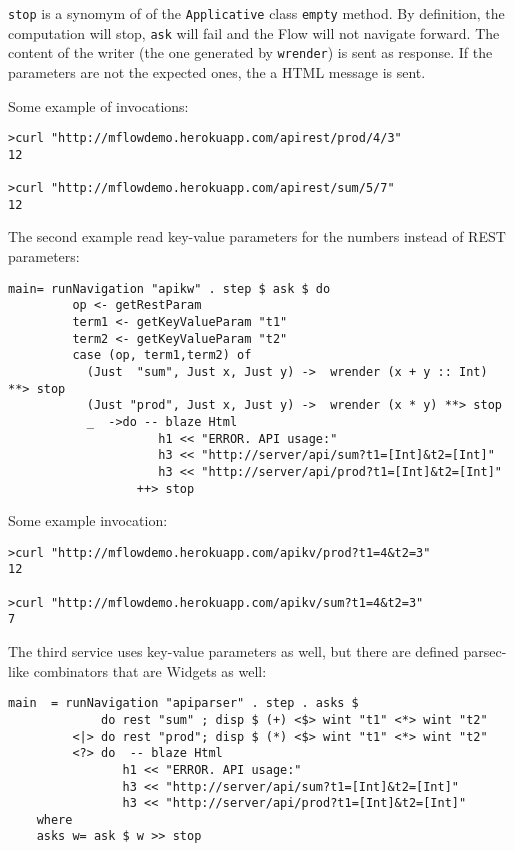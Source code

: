 \documentclass{tmr}
\begin{document}
{\tt stop} is a synomym of of the {\tt Applicative} class {\tt empty} method. By definition, the computation will stop, {\tt ask} will fail and the Flow will not
navigate forward. The content of the writer (the one generated by {\tt wrender}) is sent as response. If the parameters are not the expected ones, the a HTML message is sent.

Some example of invocations:
{\tt

\begin{verbatim}
>curl "http://mflowdemo.herokuapp.com/apirest/prod/4/3"
12

>curl "http://mflowdemo.herokuapp.com/apirest/sum/5/7"
12
\end{verbatim}
 
}
The second example read key-value parameters for the numbers instead of REST parameters:

{\tt

\begin{verbatim}
main= runNavigation "apikw" . step $ ask $ do
         op <- getRestParam
         term1 <- getKeyValueParam "t1"
         term2 <- getKeyValueParam "t2"
         case (op, term1,term2) of
           (Just  "sum", Just x, Just y) ->  wrender (x + y :: Int) **> stop
           (Just "prod", Just x, Just y) ->  wrender (x * y) **> stop
           _  ->do -- blaze Html
                     h1 << "ERROR. API usage:"
                     h3 << "http://server/api/sum?t1=[Int]&t2=[Int]"
                     h3 << "http://server/api/prod?t1=[Int]&t2=[Int]"
                  ++> stop

\end{verbatim}

}

Some example invocation:

{\tt

\begin{verbatim}
>curl "http://mflowdemo.herokuapp.com/apikv/prod?t1=4&t2=3"
12

>curl "http://mflowdemo.herokuapp.com/apikv/sum?t1=4&t2=3"
7
\end{verbatim}

}

The third service uses key-value parameters as well, but there are defined parsec-like combinators that are Widgets as well:

{\tt

\begin{verbatim}
main  = runNavigation "apiparser" . step . asks $
             do rest "sum" ; disp $ (+) <$> wint "t1" <*> wint "t2"
         <|> do rest "prod"; disp $ (*) <$> wint "t1" <*> wint "t2"
         <?> do  -- blaze Html
                h1 << "ERROR. API usage:"
                h3 << "http://server/api/sum?t1=[Int]&t2=[Int]"
                h3 << "http://server/api/prod?t1=[Int]&t2=[Int]"
    where
    asks w= ask $ w >> stop
\end{verbatim}
 
}
\end{document}
